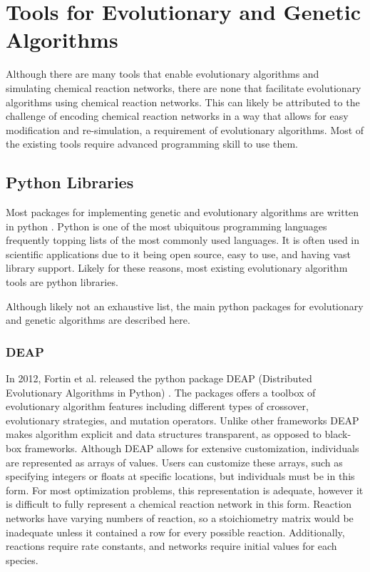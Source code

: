 \documentclass[12pt]{report}
\begin{document}
\section{Tools for Evolutionary and Genetic Algorithms}
Although there are many tools that enable evolutionary algorithms and simulating chemical reaction networks, there are none that facilitate evolutionary algorithms using chemical reaction networks. This can likely be attributed to the challenge of encoding chemical reaction networks in a way that allows for easy modification and re-simulation, a requirement of evolutionary algorithms. Most of the existing tools require advanced programming skill to use them.

\subsection{Python Libraries}

Most packages for implementing genetic and evolutionary algorithms are written in python \cite{python3}. Python is one of the most ubiquitous programming languages frequently topping lists of the most commonly used languages. It is often used in scientific applications due to it being open source, easy to use, and having vast library support. Likely for these reasons, most existing evolutionary algorithm tools are python libraries.

Although likely not an exhaustive list, the main python packages for evolutionary and genetic algorithms are described here.

\subsubsection{DEAP}
In 2012, Fortin et al. released the python package DEAP (Distributed Evolutionary Algorithms in Python) \cite{DEAP_JMLR2012}. The packages offers a toolbox of evolutionary algorithm features including different types of crossover, evolutionary strategies, and mutation operators. Unlike other frameworks DEAP makes algorithm explicit and data structures transparent, as opposed to black-box frameworks. Although DEAP allows for extensive customization, individuals are represented as arrays of values. Users can customize these arrays, such as specifying integers or floats at specific locations, but individuals must be in this form. For most optimization problems, this representation is adequate, however it is difficult to fully represent a chemical reaction network in this form. Reaction networks have varying numbers of reaction, so a stoichiometry matrix would be inadequate unless it contained a row for every possible reaction. Additionally, reactions require rate constants, and networks require initial values for each species. 
\end{document}
